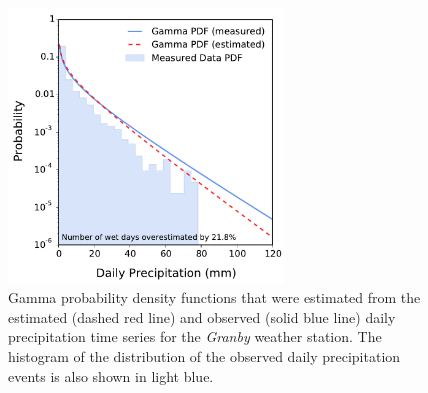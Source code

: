 \documentclass[TechnicalNoteMeteo.tex]{subfiles}
\begin{document}
\begin{figure}[!th]
    \includegraphics[width=0.65\textwidth]{img/precip_PDF}
    \caption{Gamma probability density functions that were estimated from the estimated (dashed red line) and observed (solid blue line) daily precipitation time series for the \emph{Granby} weather station. The histogram of the distribution of the observed daily precipitation events is also shown in light blue.}
    \label{fig:precip_PDF}
\end{figure}
\end{document}
